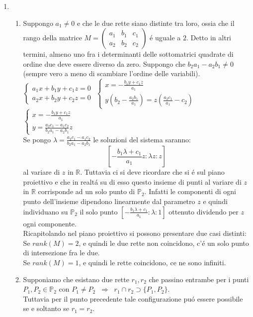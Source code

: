 \documentclass[a4paper]{article}
\newcommand{\R}{\mathbb{R}}
\newcommand{\bm}{ \begin{pmatrix} }
\newcommand{\edm}{ \end{pmatrix} }
\newcommand{\sist}{\begin{cases}}
\newcommand{\esist}{\end{cases}}
\newcommand{\ds}{\displaystyle}
\begin{document}
\begin{enumerate}
\item \begin{enumerate}
\item Suppongo $a_1 \neq 0$ e che le due rette siano distinte tra loro, ossia che il rango della matrice
$M=\bm a_1 & b_1 & c_1 \\ a_2 & b_2 & c_2\edm$ \'e uguale a $2$. Detto in altri termini, almeno uno fra i determinanti delle sottomatrici quadrate di ordine due deve essere diverso da zero. Suppongo che 
$b_2a_1-a_2b_1 \neq 0$ (sempre vero a meno di scambiare l'ordine delle variabili).\\ 
$ \sist
a_1x+b_1y+c_1z=0 \\ 
a_2x+b_2y+c_2z=0
\esist
$
$\sist
x=-\ds{\frac{b_1y+c_1z}{a_1}}\\
\ds{y\left(b_2-\frac{a_2b_1}{a_1}\right)=z\left(\frac{a_2c_1}{a_1}-c_2\right)}
\esist
$
$
\sist
x=-\ds{\frac{b_1y+c_1z}{a_1}}\\
y=\ds{\frac{a_2c_1-a_1c_2}{b_2a_1-a_2b_1}}z
\esist
$\\
Se pongo $\lambda=\ds{\frac{a_2c_1-a_1c_2}{b_2a_1-a_2b_1}}$ le soluzioni del sistema saranno:
$$\ds{\left[-\frac{b_1\lambda+c_1}{a_1}z:\lambda z: z\right]}$$
al variare di $z$ in $\R$. Tuttavia ci si deve ricordare che si \'e sul piano proiettivo e che in realt\'a su di esso questo insieme di punti al variare di $z$ in $\R$ corrisponde ad un solo punto di $\mathbb{P}_2$. Infatti le componenti di ogni punto dell'insieme dipendono linearmente dal parametro $z$ e quindi individuano su $\mathbb{P}_2$ il solo punto $\left[-\ds{\frac{b_1\lambda+c_1}{a_1}}:\lambda:1\right]$ ottenuto dividendo per $z$ ogni componente.\\
Ricapitolando nel piano proiettivo si possono presentare due casi distinti:\\
Se $rank(M)=2$, e quindi le due rette non coincidono, c'\'e un solo punto di intersezione fra le due.\\
Se $rank(M)=1$, e quindi le rette coincidono, ce ne sono infiniti.\\

\item Supponiamo che esistano due rette $r_1,r_2$ che passino entrambe per i punti 
$P_1,P_2\in\mathbb{P}_2$ con $P_1\neq P_2 \;\;\Rightarrow\;\; r_1\cap r_2 \supset \{P_1,P_2\}$.\\
Tuttavia per il punto precedente tale configurazione pu\'o essere possibile se e soltanto se $r_1=r_2$. 
\end{enumerate}




\end{enumerate}
\end{document}
